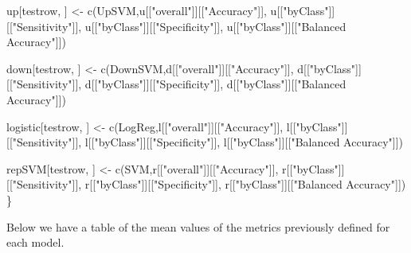 \documentclass[
]{article}
\newenvironment{Shaded}{\begin{snugshade}}{\end{snugshade}}
\newcommand{\FunctionTok}[1]{\textcolor[rgb]{0.00,0.00,0.00}{#1}}
\newcommand{\NormalTok}[1]{#1}
\newcommand{\OtherTok}[1]{\textcolor[rgb]{0.56,0.35,0.01}{#1}}
\newcommand{\StringTok}[1]{\textcolor[rgb]{0.31,0.60,0.02}{#1}}
\begin{document}
\begin{Shaded}
\begin{Highlighting}[]
\NormalTok{  up[testrow, ] }\OtherTok{\textless{}{-}} \FunctionTok{c}\NormalTok{(}\StringTok{\textquotesingle{}UpSVM\textquotesingle{}}\NormalTok{,u[[}\StringTok{"overall"}\NormalTok{]][[}\StringTok{"Accuracy"}\NormalTok{]], u[[}\StringTok{"byClass"}\NormalTok{]][[}\StringTok{"Sensitivity"}\NormalTok{]],}
\NormalTok{               u[[}\StringTok{"byClass"}\NormalTok{]][[}\StringTok{"Specificity"}\NormalTok{]], u[[}\StringTok{"byClass"}\NormalTok{]][[}\StringTok{"Balanced Accuracy"}\NormalTok{]])}
  
\NormalTok{  down[testrow, ] }\OtherTok{\textless{}{-}} \FunctionTok{c}\NormalTok{(}\StringTok{\textquotesingle{}DownSVM\textquotesingle{}}\NormalTok{,d[[}\StringTok{"overall"}\NormalTok{]][[}\StringTok{"Accuracy"}\NormalTok{]], d[[}\StringTok{"byClass"}\NormalTok{]][[}\StringTok{"Sensitivity"}\NormalTok{]],}
\NormalTok{               d[[}\StringTok{"byClass"}\NormalTok{]][[}\StringTok{"Specificity"}\NormalTok{]], d[[}\StringTok{"byClass"}\NormalTok{]][[}\StringTok{"Balanced Accuracy"}\NormalTok{]])}
  
\NormalTok{  logistic[testrow, ] }\OtherTok{\textless{}{-}} \FunctionTok{c}\NormalTok{(}\StringTok{\textquotesingle{}LogReg\textquotesingle{}}\NormalTok{,l[[}\StringTok{"overall"}\NormalTok{]][[}\StringTok{"Accuracy"}\NormalTok{]], l[[}\StringTok{"byClass"}\NormalTok{]][[}\StringTok{"Sensitivity"}\NormalTok{]],}
\NormalTok{               l[[}\StringTok{"byClass"}\NormalTok{]][[}\StringTok{"Specificity"}\NormalTok{]], l[[}\StringTok{"byClass"}\NormalTok{]][[}\StringTok{"Balanced Accuracy"}\NormalTok{]])}
  
\NormalTok{  repSVM[testrow, ] }\OtherTok{\textless{}{-}} \FunctionTok{c}\NormalTok{(}\StringTok{\textquotesingle{}SVM\textquotesingle{}}\NormalTok{,r[[}\StringTok{"overall"}\NormalTok{]][[}\StringTok{"Accuracy"}\NormalTok{]], r[[}\StringTok{"byClass"}\NormalTok{]][[}\StringTok{"Sensitivity"}\NormalTok{]],}
\NormalTok{               r[[}\StringTok{"byClass"}\NormalTok{]][[}\StringTok{"Specificity"}\NormalTok{]], r[[}\StringTok{"byClass"}\NormalTok{]][[}\StringTok{"Balanced Accuracy"}\NormalTok{]])}
\NormalTok{\}}
\end{Highlighting}
\end{Shaded}

Below we have a table of the mean values of the metrics previously
defined for each model.
\end{document}

